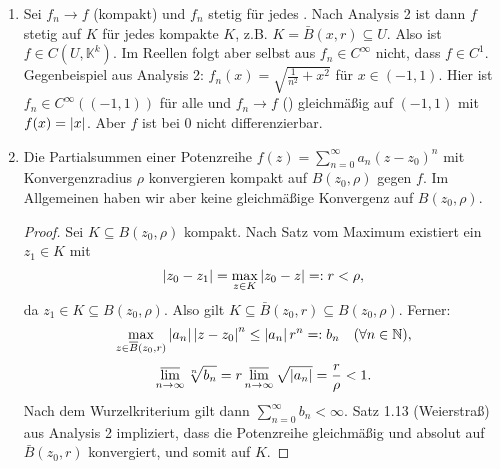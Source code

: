 \documentclass[a4paper,twoside,DIV15,BCOR12mm]{scrbook}
\begin{document}
\begin{bem} \label{bem2.33}
  \begin{enumerate}
  \item Sei $f_n\to f$ (kompakt) und $f_n$ stetig für jedes . Nach Analysis 2 ist dann $f$ stetig auf $K$ für jedes
    kompakte $K$, z.B. $K=\bar{B}(x,r)\subseteq U$. Also ist $f\in C(U,\mathbb{K}^k)$. Im Reellen folgt aber selbst aus $f_n\in
    C^\infty$ nicht, dass $f\in C^1$. Gegenbeispiel aus Analysis 2: $f_n(x) = \sqrt{\frac{1}{n^2}+x^2}$ für $x\in(-1,1)$. Hier
    ist $f_n\in C^\infty((-1,1))$ für alle  und $f_n\to f$ (\ninf) gleichmäßig auf $(-1,1)$ mit $f(x)=\left\lvert x\right\lvert$. Aber $f$
    ist bei $0$ nicht differenzierbar. %
  \item Die Partialsummen einer Potenzreihe $f(z)=\sum_{n=0}^\infty{a_n(z-z_0)^n}$ mit Konvergenzradius $\rho$ konvergieren
    kompakt auf $B(z_0,\rho)$ gegen $f$. Im Allgemeinen haben wir aber keine gleichmäßige Konvergenz auf $B(z_0,\rho)$.
    \begin{proof}
      Sei $K\subseteq B(z_0,\rho)$ kompakt. Nach Satz vom Maximum existiert ein $z_1\in K$ mit
      \[ \left\lvert z_0-z_1\right\lvert = \max_{z\in K}{\left\lvert z_0-z\right\lvert} =: r < \rho, \]
      da $z_1\in K\subseteq B(z_0,\rho)$. Also gilt $K\subseteq\bar{B}(z_0,r)\subseteq B(z_0,\rho)$. Ferner:
      \[ \max_{z\in\overline{B}(z_0,r)}{\left\lvert a_n\right\lvert\left\lvert z-z_0\right\lvert^n} \le \left\lvert a_n\right\lvert r^n =: b_n \quad (\forall n\in\mathbb{N}), \]
      \[ \varlimsup_{n\rightarrow\infty}{\sqrt[n]{b_n}} = r\varlimsup_{n\rightarrow\infty}{\sqrt{\left\lvert a_n\right\lvert}} = \frac{r}{\rho} < 1. \]
      Nach dem Wurzelkriterium gilt dann $\sum_{n=0}^\infty{b_n}<\infty$. Satz 1.13 (Weierstraß) aus Analysis 2 impliziert, dass
      die Potenzreihe gleichmäßig und absolut auf $\bar{B}(z_0,r)$ konvergiert, und somit auf $K$.
    \end{proof}
  \end{enumerate}
\end{bem}
\end{document}
